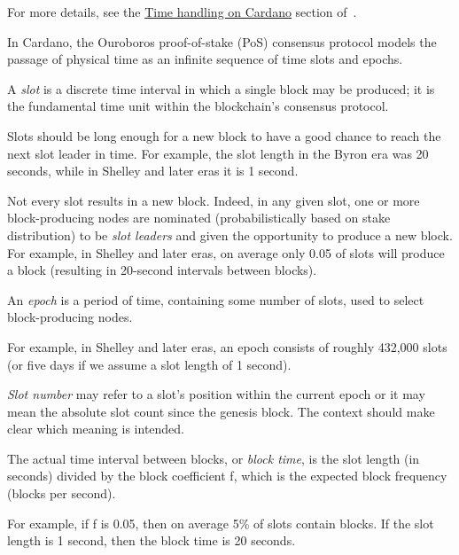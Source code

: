 For more details, see the
\href{https://docs.cardano.org/about-cardano/explore-more/time}%
     {Time handling on Cardano} section of~\cite{www-docs-cardano-time}.

In Cardano, the Ouroboros proof-of-stake (PoS) consensus protocol models the passage
of physical time as an infinite sequence of time slots and epochs.

\begin{definition}[slot]
  A \emph{slot} is a discrete time interval in which a single block may be produced; it
  is the fundamental time unit within the blockchain's consensus protocol.
\end{definition}
Slots should be long enough for a new block to have a good chance to reach
the next slot leader in time.  For example, the slot length in the Byron era was 20
seconds, while in Shelley and later eras it is 1 second.

Not every slot results in a new block.  Indeed, in any given slot, one or more
block-producing nodes are nominated (probabilistically based on stake distribution)
to be \textit{slot leaders} and given the opportunity to produce a new block.
For example, in Shelley and later eras, on average only 0.05 of slots will produce a
block (resulting in 20-second intervals between blocks).

\begin{definition}[epoch]
  An \emph{epoch} is a period of time, containing some number of slots, used to select
  block-producing nodes.
\end{definition}
For example, in Shelley and later eras, an epoch consists of roughly 432,000 slots (or five
days if we assume a slot length of 1 second).

\begin{definition}
  \emph{Slot number} may refer to a slot's position within the current epoch or it
  may mean the absolute slot count since the genesis block.  The context should make
  clear which meaning is intended.
\end{definition}

\begin{definition}
  The actual time interval between blocks, or \emph{block time}, is the slot length
  (in seconds) divided by the block coefficient f, which is the expected block
  frequency (blocks per second).
\end{definition}
For example, if f is 0.05, then on average 5\% of slots contain blocks.
If the slot length is 1 second, then the block time is 20 seconds.

